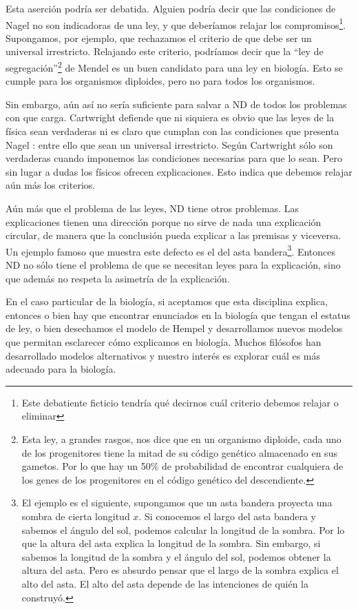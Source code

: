 Esta aserción podría ser debatida. Alguien podría decir que las condiciones de Nagel no son indicadoras de una ley, y que deberíamos relajar los compromisos\footnote{Este debatiente ficticio tendría qué decirnos cuál criterio debemos relajar o eliminar}. Supongamos, por ejemplo, que rechazamos el criterio de que debe ser un universal irrestricto. Relajando este criterio, podríamos decir que la ``ley de segregación''\footnote{Esta ley, a grandes rasgos, nos dice que en un organismo diploide, cada uno de los progenitores tiene la mitad de su código genético almacenado en sus gametos. Por lo que hay un 50\% de probabilidad de encontrar cualquiera de los genes de los progenitores en el código genético del descendiente.} de Mendel es un buen candidato para una ley en biología. Esto se cumple para los organismos diploides, pero no para todos los organismos.

Sin embargo, aún así no sería suficiente para salvar a ND de todos los problemas con que carga. Cartwright defiende que ni siquiera es obvio que las leyes de la física sean verdaderas ni es claro que cumplan con las condiciones que presenta Nagel \cite{Cartwright1983}: entre ello que sean un universal irrestricto. Según Cartwright sólo son verdaderas cuando imponemos las condiciones necesarias para que lo sean. Pero sin lugar a dudas los físicos ofrecen explicaciones. Esto indica que debemos relajar aún más los criterios.

Aún más que el problema de las leyes, ND tiene otros problemas. Las explicaciones tienen una dirección porque no sirve de nada una explicación circular, de manera que la conclusión pueda explicar a las premisas y viceversa. Un ejemplo famoso que muestra este defecto es el del asta bandera\footnote{El ejemplo es el siguiente, supongamos que un asta bandera proyecta una sombra de cierta longitud $x$. Si conocemos el largo del asta bandera y sabemos el ángulo del sol, podemos calcular la longitud de la sombra. Por lo que la altura del asta explica la longitud de la sombra. Sin embargo, si sabemos la longitud de la sombra y el ángulo del sol, podemos obtener la altura del asta. Pero es absurdo pensar que el largo de la sombra explica el alto del asta. El alto del asta depende de las intenciones de quién la construyó.}. Entonces ND no sólo tiene el problema de que se necesitan leyes para la explicación, sino que además no respeta la asimetría de la explicación.

En el caso particular de la biología, si aceptamos que esta disciplina explica, entonces o bien hay que encontrar enunciados en la biología que tengan el estatus de ley, o bien desechamos el modelo de Hempel y desarrollamos nuevos modelos que permitan esclarecer cómo explicamos en biología. Muchos filósofos han desarrollado modelos alternativos y nuestro interés es explorar cuál es más adecuado para la biología.

